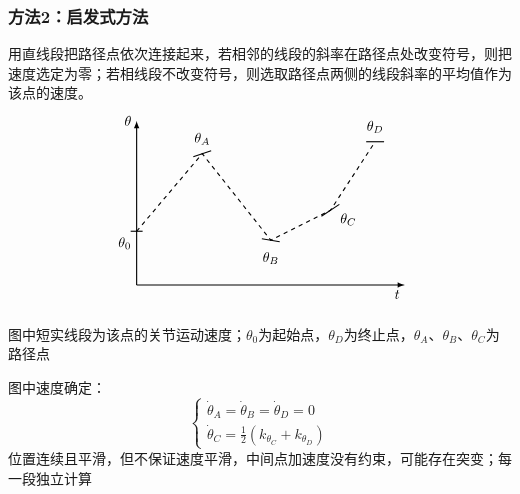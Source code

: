 \subsubsection{方法2：启发式方法}
用直线段把路径点依次连接起来，\textcolor{whusakura}{若相邻的线段的斜率在路径点处改变符号，则把速度选定为零；若相线段不改变符号，则选取路径点两侧的线段斜率的平均值作为该点的速度}。
$$
\begin{tikzpicture}[>=latex, thick, scale=.75]
    \draw[->] (0,0) -- (9,0) node[below left] {$t$};
    \draw[->] (0,0) -- (0,5.5) node[left] {$\theta$};
    \coordinate (P0) at (0, 1.8);
    \coordinate (PA) at (2.2, 4.4);
    \coordinate (PB) at (4.5, 1.5);
    \coordinate (PC) at (6.5, 2.5);
    \coordinate (PD) at (8.0, 4.8);
    \draw[dashed] (P0) -- (PA) -- (PB) -- (PC) -- (PD);
    \draw (-0.2, 1.8) -- (0.2, 1.8);         %
    \draw (PA) +(-0.3, -0.1) -- +(0.3, 0.1);      %
    \draw (PB) +(-0.3, 0.05) -- +(0.3, -0.05);      %
    \draw (PC) +(-0.3, -0.2) -- +(0.3, 0.2);      %
    \draw (PD) +(-0.3, 0) -- +(0.3, 0);      %
    \node at (-0.4, 1.4) {$\theta_0$};
    \node at (2.2, 4.9) {$\theta_A$};
    \node at (4.5, 0.9) {$\theta_B$};
    \node at (7.1, 2.2) {$\theta_C$};
    \node at (8.0, 5.3) {$\theta_D$};
\end{tikzpicture}
$$
\begin{note}
    图中短实线段为该点的关节运动速度；$\theta_0$为起始点，$\theta_D$为终止点，$\theta_A$、$\theta_B$、$\theta_C$为路径点
\end{note}

图中速度确定：
$$
\begin{cases} 
\dot{\theta}_A = \dot{\theta}_B = \dot{\theta}_D = 0 \\ 
\dot{\theta}_C = \frac{1}{2}\left(k_{\theta_C}+k_{\theta_D}\right)
\end{cases}
$$
位置连续且平滑，但不保证速度平滑，中间点加速度没有约束，可能存在突变；每一段独立计算

